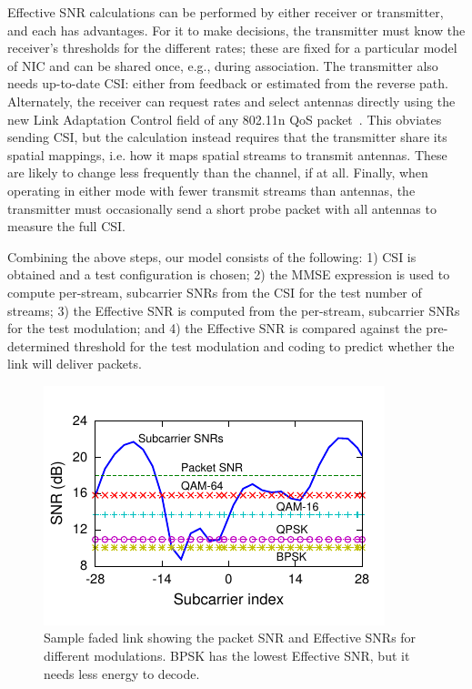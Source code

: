  Effective SNR calculations can be performed by either receiver or transmitter, and each has advantages. For it to make decisions, the transmitter must know the receiver's thresholds for the different rates; these are fixed for a particular model of NIC and can be shared once, e.g., during association. The transmitter also needs up-to-date CSI: either from feedback or estimated from the reverse path. Alternately, the receiver can request rates and select antennas directly using the new Link Adaptation Control field of any 802.11n QoS packet~\cite[\S7.1.3.5a]{80211n}. This obviates sending CSI, but the calculation instead requires that the transmitter share its spatial mappings, i.e. how it maps spatial streams to transmit antennas. These are likely to change less frequently than the channel, if at all. Finally, when operating in either mode with fewer transmit streams than antennas, the transmitter must occasionally send a short probe packet with all antennas to measure the full CSI\@.

 Combining the above steps, our model consists of the following: 1) CSI is obtained and a test configuration is chosen; 2) the MMSE expression is used to compute per-stream, subcarrier SNRs from the CSI for the test number of streams; 3) the Effective SNR is computed from the per-stream, subcarrier SNRs for the test modulation; and 4) the Effective SNR is compared against the pre-determined threshold for the test modulation and coding to predict whether the link will deliver packets.

\begin{figure}[t]
  \centering
  \includegraphics[width=0.9\columnwidth,viewport=0 9 180 111,clip]{figures/embed_fsf-shape-eff-snr-s3d5-txpower-20.pdf}
  \vspace{-4pt}
  \caption{Sample faded link showing the packet SNR and Effective SNRs for different modulations. BPSK has the lowest Effective SNR, but it needs less energy to decode.}
  \label{fig:eff_example}
  \vspace{-3pt}
\end{figure}


